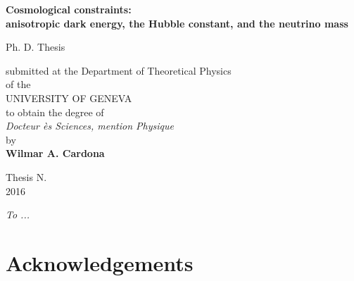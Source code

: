 \documentclass[12pt]{report}
\date{}
\renewcommand{\(}{\left(}
\renewcommand{\)}{\right)}
\renewcommand{\[}{\left[}
\renewcommand{\]}{\right]}
\begin{document}
\renewcommand{\figurename}{\textbf{Fig.}}
\renewcommand{\tablename}{\textbf{Tab.}}

\thispagestyle{empty}
\begin{center}  

\Large  \textbf{Cosmological constraints: \\
anisotropic dark energy, the Hubble constant, and the neutrino mass} \\
  
\vspace{3.5cm}  

\large Ph. D. Thesis

\vspace{3.5cm}

submitted at the Department of Theoretical Physics \\

of the \\

UNIVERSITY OF GENEVA\\

to obtain the degree of \\

\textit{Docteur ès Sciences, mention Physique}\\

by\\

\large \textbf{Wilmar A. Cardona}\\  

\vspace{3.5cm} 

\large Thesis N. \\  
\normalsize 2016  

\end{center}  

\newpage  
{}
  
  
\vspace{6cm}  
\begin{center}

\large \textit{To ...}
\normalsize

\end{center}
  
\newpage  

\chapter*{Acknowledgements} 

\vspace{3mm}
\end{document}
